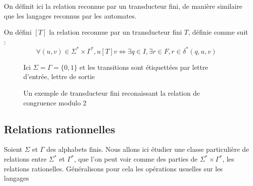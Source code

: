 \documentclass{scrartcl}
\begin{document}
\begin{flushleft}
On définit ici la relation reconnue par un transducteur fini, de manière similaire que les
langages reconnus par les automates.
\begin{define}
    On défini $[T]$ la relation reconnue par un transducteur fini $T$, définie comme suit :
    \[ \forall (u, v) \in \Sigma^* \times \Gamma^*, u[T]v \Leftrightarrow \exists q \in I, \exists r \in F,
    r \in \delta^*(q, u, v) \]
\end{define}

\begin{figure}[h]
    \caption{Un exemple de transducteur fini reconaissant la relation de congruence modulo 2}
    \begin{center}
    Ici $\Sigma = \Gamma = \{0, 1\}$ et les transitions sont étiquettées par lettre d'entrée, lettre de sortie\\
    \vspace*{0.5cm}
    \end{center}
\end{figure}

\vspace*{2cm}

\subsection{Relations rationnelles}

Soient $\Sigma$ et $\Gamma$ des alphabets finis. Nous allons ici étudier une classe particulière
de relations entre $\Sigma^*$ et $\Gamma^*$, que l'on peut voir comme des parties de $\Sigma^* \times \Gamma^*$,
les relations rationelles. Généralisons pour cela les opérations usuelles sur les langages 


\end{flushleft}
\end{document}
